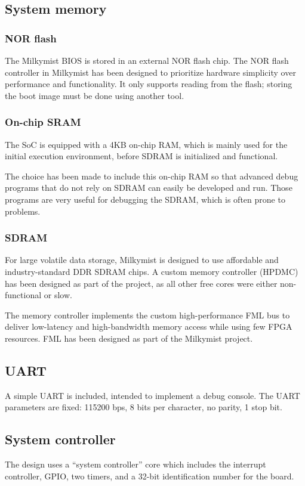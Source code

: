 \documentclass[a4paper,11pt]{article}
\begin{document}
\subsection{System memory}
\subsubsection{NOR flash}
The Milkymist BIOS is stored in an external NOR flash chip. The NOR flash controller in Milkymist has been designed to prioritize hardware simplicity over performance and functionality. It only supports reading from the flash; storing the boot image must be done using another tool.

\subsubsection{On-chip SRAM}
The SoC is equipped with a 4KB on-chip RAM, which is mainly used for the initial execution environment, before SDRAM is initialized and functional.

The choice has been made to include this on-chip RAM so that advanced debug programs that do not rely on SDRAM can easily be developed and run. Those programs are very useful for debugging the SDRAM, which is often prone to problems.

\subsubsection{SDRAM}
For large volatile data storage, Milkymist is designed to use affordable and industry-standard DDR SDRAM chips. A custom memory controller (HPDMC) has been designed as part of the project, as all other free cores were either non-functional or slow.

The memory controller implements the custom high-performance FML bus to deliver low-latency and high-bandwidth memory access while using few FPGA resources. FML has been designed as part of the Milkymist project.

\subsection{UART}
A simple UART is included, intended to implement a debug console. The UART parameters are fixed: 115200 bps, 8 bits per character, no parity, 1 stop bit.

\subsection{System controller}
The design uses a ``system controller'' core which includes the interrupt controller, GPIO, two timers, and a 32-bit identification number for the board.
\end{document}
